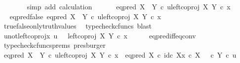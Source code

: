 \begin{isabellebody}
\ \ \ \ \ \ \isamarkupfalse%
\ {\isacharparenleft}{\kern0pt}simp\ add{\isacharcolon}{\kern0pt}\ calculation{\isacharparenright}{\kern0pt}\isanewline
\ \ \isamarkupfalse%
\isanewline
{}\isamarkupfalse%
\isanewline
\ \ \isamarkupfalse%
\ {\isachardoublequoteopen}eq{\isacharunderscore}{\kern0pt}pred\ {\isacharparenleft}{\kern0pt}X\ {\isasymCoprod}\ Y{\isacharparenright}{\kern0pt}\ {\isasymcirc}\isactrlsub c\ {\isasymlangle}u{\isacharcomma}{\kern0pt}left{\isacharunderscore}{\kern0pt}coproj\ X\ Y\ {\isasymcirc}\isactrlsub c\ x{\isasymrangle}\ {\isasymnoteq}\ {\isasymt}{\isachardoublequoteclose}\isanewline
\ \ \isamarkupfalse%
\ \isamarkupfalse%
\ eq{\isacharunderscore}{\kern0pt}pred{\isacharunderscore}{\kern0pt}false{\isacharcolon}{\kern0pt}\ {\isachardoublequoteopen}eq{\isacharunderscore}{\kern0pt}pred\ {\isacharparenleft}{\kern0pt}X\ {\isasymCoprod}\ Y{\isacharparenright}{\kern0pt}\ {\isasymcirc}\isactrlsub c\ {\isasymlangle}u{\isacharcomma}{\kern0pt}left{\isacharunderscore}{\kern0pt}coproj\ X\ Y\ {\isasymcirc}\isactrlsub c\ x{\isasymrangle}\ {\isacharequal}{\kern0pt}\ {\isasymf}{\isachardoublequoteclose}\isanewline
\ \ \ \ \isamarkupfalse%
\ true{\isacharunderscore}{\kern0pt}false{\isacharunderscore}{\kern0pt}only{\isacharunderscore}{\kern0pt}truth{\isacharunderscore}{\kern0pt}values\ \isamarkupfalse%
\ {\isacharparenleft}{\kern0pt}typecheck{\isacharunderscore}{\kern0pt}cfuncs{\isacharcomma}{\kern0pt}\ blast{\isacharparenright}{\kern0pt}\isanewline
\ \ \isamarkupfalse%
\ \isamarkupfalse%
\ u{\isacharunderscore}{\kern0pt}not{\isacharunderscore}{\kern0pt}left{\isacharunderscore}{\kern0pt}coproj{\isacharunderscore}{\kern0pt}x{\isacharcolon}{\kern0pt}\ {\isachardoublequoteopen}u\ \ {\isasymnoteq}\ left{\isacharunderscore}{\kern0pt}coproj\ X\ Y\ {\isasymcirc}\isactrlsub c\ x{\isachardoublequoteclose}\isanewline
\ \ \ \ \isamarkupfalse%
\ eq{\isacharunderscore}{\kern0pt}pred{\isacharunderscore}{\kern0pt}iff{\isacharunderscore}{\kern0pt}eq{\isacharunderscore}{\kern0pt}conv\ \isamarkupfalse%
\ {\isacharparenleft}{\kern0pt}typecheck{\isacharunderscore}{\kern0pt}cfuncs{\isacharunderscore}{\kern0pt}prems{\isacharcomma}{\kern0pt}\ presburger{\isacharparenright}{\kern0pt}\isanewline
\ \ \isamarkupfalse%
\ {\isachardoublequoteopen}eq{\isacharunderscore}{\kern0pt}pred\ {\isacharparenleft}{\kern0pt}X\ {\isasymCoprod}\ Y{\isacharparenright}{\kern0pt}\ {\isasymcirc}\isactrlsub c\ {\isasymlangle}u{\isacharcomma}{\kern0pt}left{\isacharunderscore}{\kern0pt}coproj\ X\ Y\ {\isasymcirc}\isactrlsub c\ x{\isasymrangle}\ {\isacharequal}{\kern0pt}\ {\isacharparenleft}{\kern0pt}eq{\isacharunderscore}{\kern0pt}pred\ X\ {\isasymcirc}\isactrlsub c\ {\isasymlangle}id\isactrlsub c\ X{\isacharcomma}{\kern0pt}x\ {\isasymcirc}\isactrlsub c\ {\isasymbeta}\isactrlbsub X\isactrlesub {\isasymrangle}{\isacharparenright}{\kern0pt}\ {\isasymamalg}\ {\isacharparenleft}{\kern0pt}{\isasymf}\ {\isasymcirc}\isactrlsub c\ {\isasymbeta}\isactrlbsub Y\isactrlesub {\isacharparenright}{\kern0pt}\ {\isasymcirc}\isactrlsub c\ u{\isachardoublequoteclose}\isanewline

\end{isabellebody}
